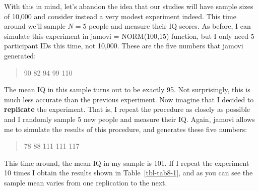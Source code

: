 \documentclass[
  a4paper,
]{book}
\begin{document}
With this in mind, let's abandon the idea that our studies will have
sample sizes of 10,000 and consider instead a very modest experiment
indeed. This time around we'll sample \(N = 5\) people and measure their
IQ scores. As before, I can simulate this experiment in jamovi =
NORM(100,15) function, but I only need 5 participant IDs this time, not
10,000. These are the five numbers that jamovi generated:

\begin{quote}
90 82 94 99 110
\end{quote}

The mean IQ in this sample turns out to be exactly 95. Not surprisingly,
this is much less accurate than the previous experiment. Now imagine
that I decided to \textbf{replicate} the experiment. That is, I repeat
the procedure as closely as possible and I randomly sample 5 new people
and measure their IQ. Again, jamovi allows me to simulate the results of
this procedure, and generates these five numbers:

\begin{quote}
78 88 111 111 117
\end{quote}

This time around, the mean IQ in my sample is 101. If I repeat the
experiment 10 times I obtain the results shown in
Table~\ref{tbl-tab8-1}, and as you can see the sample mean varies from
one replication to the next.

\hypertarget{tbl-tab8-1}{}
 
  \providecommand{\huxb}[2]{\arrayrulecolor[RGB]{#1}\global\arrayrulewidth=#2pt}
  \providecommand{\huxvb}[2]{\color[RGB]{#1}\vrule width #2pt}
  \providecommand{\huxtpad}[1]{\rule{0pt}{#1}}
  \providecommand{\huxbpad}[1]{\rule[-#1]{0pt}{#1}}
\end{document}
